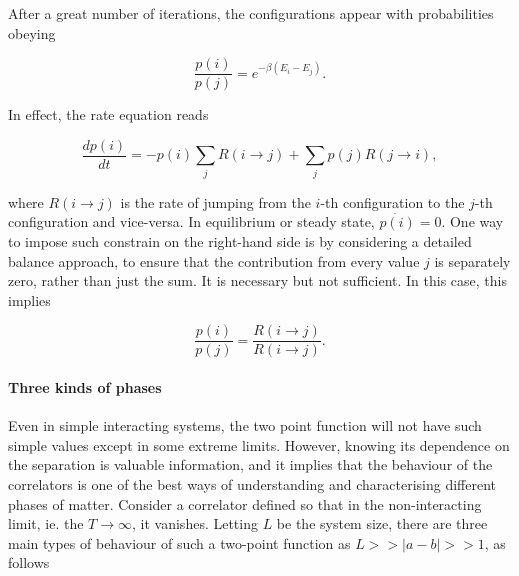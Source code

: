 \documentclass{homework}
\begin{document}
After a great number of iterations, the configurations appear with probabilities obeying 

$$
    \frac{p(i)}{p(j)} = e^{-\beta (E_i - E_j)}.
$$

In effect, the rate equation reads 

\begin{equation*}
    \frac{dp(i)}{dt} = -p(i) \sum_{j} R(i\rightarrow j) + \sum_{j} p(j) R(j\rightarrow i),
\end{equation*}

where $R(i\rightarrow j)$ is the rate of jumping from the $i$-th configuration to the $j$-th configuration and vice-versa. In equilibrium or steady state, $\dot{p(i)} = 0$. One way to impose such constrain on the right-hand side is by considering a detailed balance approach, to ensure that the contribution from every value $j$ is separately zero, rather than just the sum. It is necessary but not sufficient. In this case, this implies 

\begin{equation}
    \frac{p(i)}{p(j)} = \frac{R(i\rightarrow j)}{R(i\rightarrow j)}.
\end{equation}

\clearpage

\paragraph{\textbf{Three kinds of phases}}

Even in simple interacting systems, the two point function will not have such simple values except in some extreme limits. However, knowing its dependence on the separation is valuable information, and it implies that the behaviour of the correlators is one of the best ways of understanding and characterising different phases of matter. Consider a correlator defined so that in the non-interacting limit, ie. the $T \rightarrow \infty$, it vanishes. Letting $L$ be the system size, there are three main types of behaviour of such a two-point function as $L >> |a-b|>> 1$, as follows 
\end{document}
